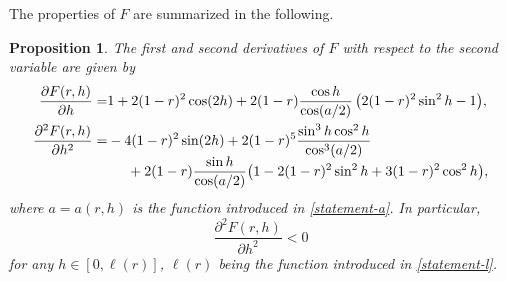 \documentclass[JEP,XML,SOM,Unicode,NoFloatCountersInSection]{cedram}
\theoremstyle{plain}
\newtheorem{proposition}[theorem]{Proposition}
\theoremstyle{definition}
\begin{document}
The properties of $F$ are summarized in the following.
\begin{proposition}\label{prop5}
The first and second derivatives of $F$ with respect to the second variable are given by
\begin{align}
\frac{\partial F(r,h)}{\partial h} = &1+2(1-r)^2 \cos(2h)+2(1-r)\frac{\cos h}{\cos(a/2)}\,\bigl(2(1-r)^2\sin^2 h -1\bigr), \label{ap2}
\\
\frac{\partial^2 F(r,h)}{\partial h^2} = & - 4 (1-r)^2 \sin(2h) + 2 (1-r)^5 \frac{\sin^3 h \cos^2 h}{\cos^3(a/2)}\label{ap3}
\\[-5pt]
& \hspace*{.5cm}+2 (1-r)\frac{\sin h}{\cos(a/2)} \bigl( 1-2(1-r)^2\sin^2 h + 3 (1-r)^2 \cos^2 h \bigr),\notag
\end{align}
where $a=a(r,h)$ is the function introduced in \eqref{statement-a}.
In particular,
\[
\frac{\partial^2 F(r,h)}{\partial h^2}<0
\]
for any $h\in [0,\ell(r)]$, $\ell(r)$ being the function introduced in \eqref{statement-l}.
\end{proposition}
\end{document}
